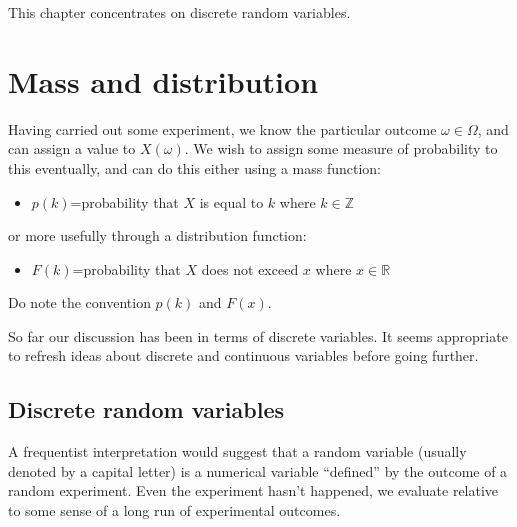 \documentclass[12pt]{extbook}
\begin{document}
This chapter concentrates on discrete random variables.




\section{Mass and distribution}

Having carried out some experiment, we know the particular outcome $\omega \in \Omega$, and can assign a value to $X(\omega)$.   We wish to assign some measure of probability to this eventually, and can do this either using a mass function:

\begin{itemize}
\item $p(k)$=probability that $X$ is equal to $k$ where $k \in \mathbb{Z}$
\end{itemize}

or more usefully through a distribution function:

\begin{itemize}
\item $F(k)$=probability that $X$ does not exceed $x$ where $x \in \mathbb{R}$
\end{itemize}

Do note the convention $p(k)$ and $F(x)$.



So far our discussion has been in terms of discrete variables.   It seems appropriate to refresh ideas about discrete and continuous variables before going further.




\subsection{Discrete random variables}


A frequentist interpretation would suggest that a random variable (usually denoted by a capital letter) is a numerical variable ``defined'' by the outcome of a random experiment.   Even the experiment hasn't happened, we evaluate relative to some sense of a long run of experimental outcomes.   
\end{document}
